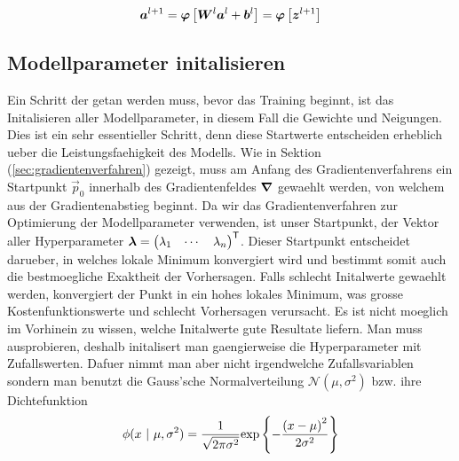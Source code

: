 \begin{equation}\label{eq:aktivierung_matrix}
  \bm{a}^{l+1} = \bm{\varphi} \left[\bm{W}^{l} \bm{a}^{l} + \bm{b}^{l} \right] = \bm{\varphi} \left[ \bm{z}^{l+1} \right]
\end{equation}

\para{}
\cite{Nielsen}

\subsection{Modellparameter initalisieren}
Ein Schritt der getan werden muss, bevor das Training beginnt, ist das
Initalisieren aller Modellparameter, in diesem Fall die Gewichte und Neigungen.
Dies ist ein sehr essentieller Schritt, denn diese Startwerte entscheiden
erheblich ueber die Leistungsfaehigkeit des Modells.
\para{}
Wie in Sektion (\ref{sec:gradientenverfahren}) gezeigt, muss am Anfang des
Gradientenverfahrens ein Startpunkt $\vec{p}_0$ innerhalb des Gradientenfeldes
$\bm{\nabla}$ gewaehlt werden, von welchem aus der Gradientenabstieg beginnt.
Da wir das Gradientenverfahren zur Optimierung der Modellparameter verwenden,
ist unser Startpunkt, der Vektor aller Hyperparameter
$\bm{\lambda} = \begin{pmatrix} \lambda_1 & \cdots & \lambda_n \end{pmatrix}^{\mathsf{T}}$.
Dieser Startpunkt entscheidet darueber, in welches lokale Minimum konvergiert
wird und bestimmt somit auch die bestmoegliche Exaktheit der Vorhersagen. Falls
schlecht Initalwerte gewaehlt werden, konvergiert der Punkt in ein hohes lokales
Minimum, was grosse Kostenfunktionswerte und schlecht Vorhersagen verursacht.
\para{}
Es ist nicht moeglich im Vorhinein zu wissen, welche Initalwerte gute Resultate
liefern. Man muss ausprobieren, deshalb initalisert man gaengierweise die
Hyperparameter mit Zufallswerten. Dafuer nimmt man aber nicht irgendwelche
Zufallsvariablen sondern man benutzt die Gauss'sche Normalverteilung
$\mathcal{N}(\mu,\sigma^2)$ bzw. ihre Dichtefunktion
\[\ds \phi(x\ |\ \mu,\sigma^2) = \frac{1}{\sqrt{2\pi\sigma^2}} \text{exp} \left\{-\frac{{(x-\mu)}^2}{2\sigma^2}\right\} \]
\para{}



